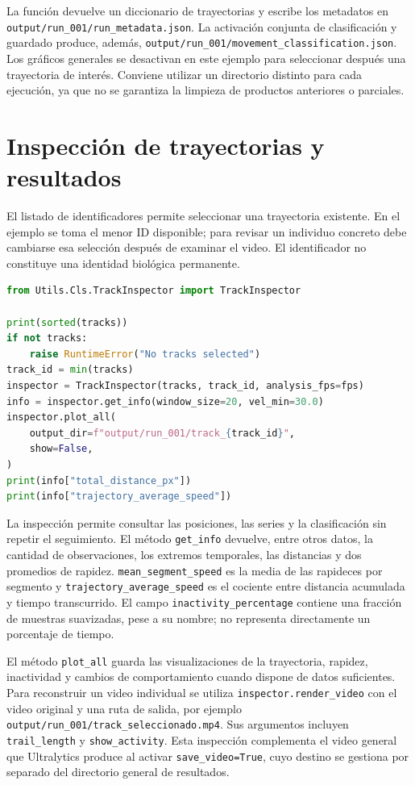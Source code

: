 La función devuelve un diccionario de trayectorias y escribe los metadatos en \nolinkurl{output/run_001/run_metadata.json}. La activación conjunta de clasificación y guardado produce, además, \nolinkurl{output/run_001/movement_classification.json}. Los gráficos generales se desactivan en este ejemplo para seleccionar después una trayectoria de interés. Conviene utilizar un directorio distinto para cada ejecución, ya que no se garantiza la limpieza de productos anteriores o parciales.

\section{Inspección de trayectorias y resultados}

El listado de identificadores permite seleccionar una trayectoria existente. En el ejemplo se toma el menor ID disponible; para revisar un individuo concreto debe cambiarse esa selección después de examinar el video. El identificador no constituye una identidad biológica permanente.

\noindent\begin{minipage}{\linewidth}
\begin{lstlisting}[style=thesiscode,language=Python]
from Utils.Cls.TrackInspector import TrackInspector

print(sorted(tracks))
if not tracks:
    raise RuntimeError("No tracks selected")
track_id = min(tracks)
inspector = TrackInspector(tracks, track_id, analysis_fps=fps)
info = inspector.get_info(window_size=20, vel_min=30.0)
inspector.plot_all(
    output_dir=f"output/run_001/track_{track_id}",
    show=False,
)
print(info["total_distance_px"])
print(info["trajectory_average_speed"])
\end{lstlisting}
\end{minipage}\par

La inspección permite consultar las posiciones, las series y la clasificación sin repetir el seguimiento. El método \verb|get_info| devuelve, entre otros datos, la cantidad de observaciones, los extremos temporales, las distancias y dos promedios de rapidez. \verb|mean_segment_speed| es la media de las rapideces por segmento y \verb|trajectory_average_speed| es el cociente entre distancia acumulada y tiempo transcurrido. El campo \verb|inactivity_percentage| contiene una fracción de muestras suavizadas, pese a su nombre; no representa directamente un porcentaje de tiempo.

El método \verb|plot_all| guarda las visualizaciones de la trayectoria, rapidez, inactividad y cambios de comportamiento cuando dispone de datos suficientes. Para reconstruir un video individual se utiliza \verb|inspector.render_video| con el video original y una ruta de salida, por ejemplo \nolinkurl{output/run_001/track_seleccionado.mp4}. Sus argumentos incluyen \verb|trail_length| y \verb|show_activity|. Esta inspección complementa el video general que Ultralytics produce al activar \verb|save_video=True|, cuyo destino se gestiona por separado del directorio general de resultados.

